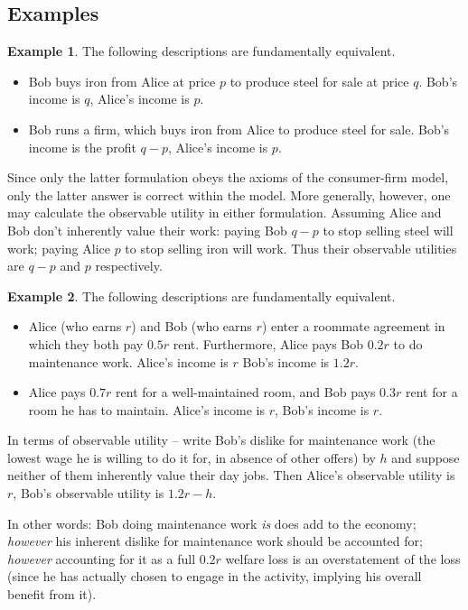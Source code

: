 \documentclass{journal}
\theoremstyle{plain}
\theoremstyle{definition}
\newtheorem{eg}{Example}
\theoremstyle{remark}
\begin{document}
\subsection{Examples}
\label{sec:eg}

\begin{eg}
    \label{eg:1}
    The following descriptions are fundamentally equivalent.
    \begin{itemize}
        \item Bob buys iron from Alice at price $p$ to produce steel for sale at price $q$. Bob's income is $q$, Alice's income is $p$.
        \item Bob runs a firm, which buys iron from Alice to produce steel for sale. Bob's income is the profit $q-p$, Alice's income is $p$.
    \end{itemize}
    Since only the latter formulation obeys the axioms of the consumer-firm model, only the latter answer is correct within the model. More generally, however, one may calculate the observable utility in either formulation. Assuming Alice and Bob don't inherently value their work: paying Bob $q-p$ to stop selling steel will work; paying Alice $p$ to stop selling iron will work. Thus their observable utilities are $q-p$ and $p$ respectively.
\end{eg}

\begin{eg}
    \label{eg:2}
    The following descriptions are fundamentally equivalent.
    \begin{itemize}
        \item Alice (who earns $r$) and Bob (who earns $r$) enter a roommate agreement in which they both pay $0.5r$ rent. Furthermore, Alice pays Bob $0.2r$ to do maintenance work. Alice's income is $r$ Bob's income is $1.2r$.
        \item Alice pays $0.7r$ rent for a well-maintained room, and Bob pays $0.3r$ rent for a room he has to maintain. Alice's income is $r$, Bob's income is $r$.
    \end{itemize}
    In terms of observable utility -- write Bob's dislike for maintenance work (the lowest wage he is willing to do it for, in absence of other offers) by $h$ and suppose neither of them inherently value their day jobs. Then Alice's observable utility is $r$, Bob's observable utility is $1.2r-h$.
    
    In other words: Bob doing maintenance work \emph{is} does add to the economy; \emph{however} his inherent dislike for maintenance work should be accounted for; \emph{however} accounting for it as a full $0.2r$ welfare loss is an overstatement of the loss (since he has actually chosen to engage in the activity, implying his overall benefit from it).
\end{eg}
\end{document}
